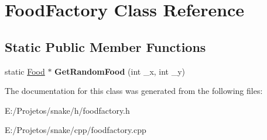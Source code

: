 \hypertarget{class_food_factory}{}\section{Food\+Factory Class Reference}
\label{class_food_factory}
\subsection*{Static Public Member Functions}
\begin{DoxyCompactItemize}
\item 
\hypertarget{class_food_factory_a74b2358ad6b07df79c20a893de827e22}{}static \hyperlink{struct_food}{Food} $\ast$ {\bfseries Get\+Random\+Food} (int \+\_\+x, int \+\_\+y)\label{class_food_factory_a74b2358ad6b07df79c20a893de827e22}

\end{DoxyCompactItemize}


The documentation for this class was generated from the following files\+:\begin{DoxyCompactItemize}
\item 
E\+:/\+Projetos/snake/h/foodfactory.\+h\item 
E\+:/\+Projetos/snake/cpp/foodfactory.\+cpp\end{DoxyCompactItemize}
